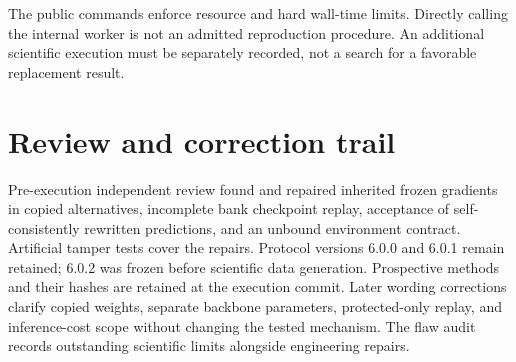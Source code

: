 The public commands enforce resource and hard wall-time limits. Directly calling
the internal worker is not an admitted reproduction procedure. An additional
scientific execution must be separately recorded, not a search for a favorable
replacement result.

\section{Review and correction trail}
Pre-execution independent review found and repaired inherited frozen gradients
in copied alternatives, incomplete bank checkpoint replay, acceptance of
self-consistently rewritten predictions, and an unbound environment contract.
Artificial tamper tests cover the repairs. Protocol versions 6.0.0 and 6.0.1
remain retained; 6.0.2 was frozen before scientific data generation. Prospective
methods and their hashes are retained at the execution commit. Later wording
corrections clarify copied weights, separate backbone parameters, protected-only
replay, and inference-cost scope without changing the tested mechanism. The
flaw audit records outstanding scientific limits alongside engineering repairs.
